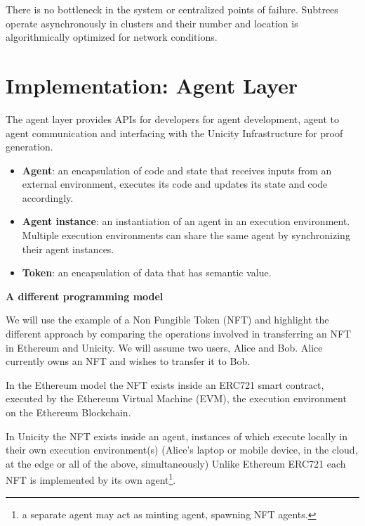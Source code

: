 \documentclass{article}
\begin{document}
\vspace{2mm}

There is no bottleneck in the system or centralized points of failure. Subtrees operate asynchronously in clusters and their number and location is algorithmically optimized for network conditions.


\section{Implementation: Agent Layer}


The agent layer provides APIs for developers for agent development, agent to agent communication and interfacing with the Unicity Infrastructure for proof generation. 
\vspace{2mm}

\begin{itemize}
\setlength{\leftmargin}{1em}
\item \textbf{Agent}: an encapsulation of code and state that receives inputs from an external environment, executes its code and updates its state and code accordingly.
\item \textbf{Agent instance}: an instantiation of an agent in an execution environment. Multiple execution environments can share the same agent by synchronizing their agent instances. 
\item \textbf{Token}: an encapsulation of data that has semantic value.
 
\end{itemize}


\textbf{A different programming model}
\vspace{2mm}

We will use the example of a Non Fungible Token (NFT) and highlight the different approach by comparing the operations involved in transferring an NFT in Ethereum and Unicity.  We will assume two users, Alice and Bob. Alice currently owns an NFT and wishes to transfer it to Bob. \vspace{2mm}

In the Ethereum model the NFT exists inside an ERC721 smart contract, executed by the Ethereum Virtual Machine (EVM), the execution environment on the Ethereum Blockchain. 

\vspace{2mm}

In Unicity the NFT exists inside an agent, instances of which execute locally in their own execution environment(s) (Alice's laptop or mobile device, in the cloud, at the edge or all of the above, simultaneously) Unlike Ethereum ERC721 each NFT is implemented by its own agent\footnote{a separate agent may act as minting agent, spawning NFT agents.}.  
\vspace{2mm}
\end{document}

